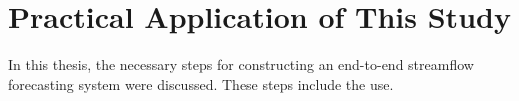\section{Practical Application of This Study}

In this thesis, the necessary steps for constructing an end-to-end streamflow forecasting system were discussed. These steps include the use.